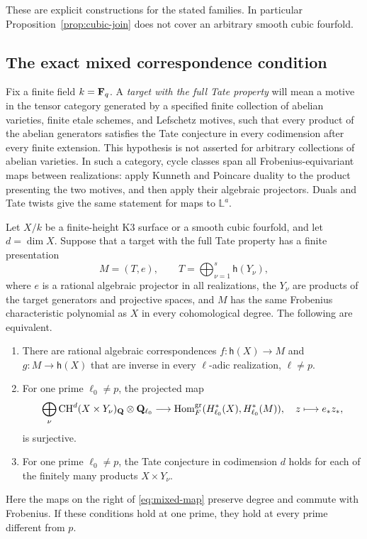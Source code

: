 These are explicit constructions for the stated families. In
particular Proposition~\ref{prop:cubic-join} does not cover an
arbitrary smooth cubic fourfold.

\subsection{The exact mixed correspondence condition}

Fix a finite field $k=\mathbf F_q$. A \emph{target with the full Tate
property} will mean a motive in the tensor category generated by
a specified finite collection of abelian varieties, finite etale
schemes, and Lefschetz motives, such that every product of the
abelian generators satisfies the Tate conjecture in every
codimension after every finite extension. This hypothesis is not
asserted for arbitrary collections of abelian varieties.
In such a category, cycle classes span all Frobenius-equivariant
maps between realizations: apply Kunneth and Poincare duality to
the product presenting the two motives, and then apply their
algebraic projectors. Duals and Tate twists give the same statement
for maps to $\mathbb L^a$.

\begin{theorem}\label{thm:mixed-condition}
Let $X/k$ be a finite-height K3 surface or a smooth cubic fourfold,
and let $d=\dim X$. Suppose that a target with the full Tate property
has a finite presentation
\[
 M=(T,e),\qquad T=\bigoplus_{\nu=1}^s\mathsf h(Y_\nu),
\]
where $e$ is a rational algebraic projector in all realizations,
the $Y_\nu$ are products of the target generators and projective
spaces, and $M$ has the same Frobenius characteristic polynomial
as $X$ in every cohomological degree. The following are equivalent.
\begin{enumerate}
\item There are rational algebraic correspondences
$f:\mathsf h(X)\to M$ and $g:M\to\mathsf h(X)$ that are inverse
in every $\ell$-adic realization, $\ell\ne p$.
\item For one prime $\ell_0\ne p$, the projected map
\begin{equation}\label{eq:mixed-map}
 \bigoplus_\nu\operatorname{CH}^{d}(X\times Y_\nu)_{\mathbf Q}
       \otimes\mathbf Q_{\ell_0}
 \longrightarrow
 \operatorname{Hom}_{F}^{\mathrm{gr}}
       (H^*_{\ell_0}(X),H^*_{\ell_0}(M)),\quad z\longmapsto e_*z_*,
\end{equation}
is surjective.
\item For one prime $\ell_0\ne p$, the Tate conjecture in
codimension $d$ holds for each of the finitely many products
$X\times Y_\nu$.
\end{enumerate}
Here the maps on the right of \eqref{eq:mixed-map} preserve degree
and commute with Frobenius. If these conditions hold at one prime,
they hold at every prime different from $p$.
\end{theorem}

